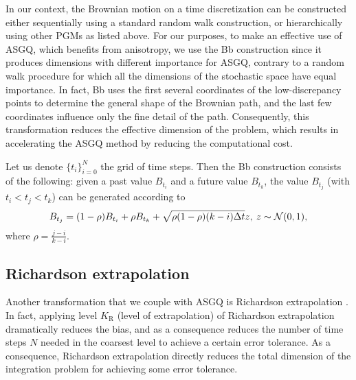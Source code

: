 In our context, the Brownian motion on a time discretization  can be constructed either sequentially using a standard random walk construction, or hierarchically using   other PGMs as listed above. For our purposes, to make an effective use of ASGQ, which benefits from anisotropy, we use the Bb construction since it produces  dimensions with different importance for ASGQ, contrary to a random walk procedure for which all the dimensions of the stochastic space have equal importance. In fact, Bb uses the first several coordinates of the low-discrepancy points to determine the general shape of the Brownian path, and the last few coordinates influence only the fine detail of the path. Consequently, this transformation  reduces the effective dimension  of the problem, which results in accelerating the ASGQ method by reducing the computational cost.

Let us denote $\{t_i\}_{i=0}^{N}$ the grid of time steps. Then the Bb construction \cite{glasserman2004monte} consists of the following: given a past value $B_{t_i}$ and a future value $B_{t_k}$, the value $B_{t_j}$ (with $t_i < t_j < t_k$) can be generated according to 
\begin{equation*}
B_{t_j}=(1-\rho) B_{t_i}+\rho B_{t_k}+ \sqrt{\rho (1-\rho)(k-i) \Delta t} z, \: z \sim \mathcal{N}(0,1) ,
\end{equation*}
where $\rho=\frac{j-i}{k-i}$.  

\subsection{Richardson extrapolation}\label{sec:Richardson extrapolation}
Another transformation that we couple with ASGQ is Richardson extrapolation \cite{talay1990expansion}. In fact, applying level $K_\text{R}$ (level of extrapolation) of Richardson extrapolation  dramatically reduces the bias, and as a consequence reduces the  number of time steps $N$ needed in the coarsest level to achieve a certain error tolerance. As a consequence, Richardson extrapolation directly reduces  the total dimension of the integration problem for achieving some error tolerance.

